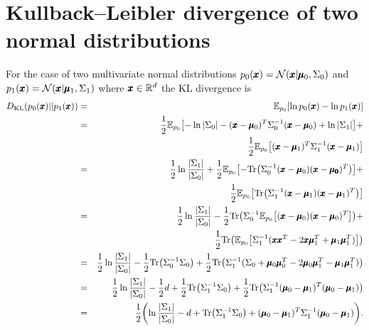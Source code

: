 \section{Kullback--Leibler divergence of two normal distributions}
For the case of two multivariate normal distributions $p_{0}(\pmb{{x}})=\mathcal{N}(\pmb{{x}}|\pmb{{\mu}}_{0},\Sigma_{0})$ and $p_{1}(\pmb{{x}})=\mathcal{N}(\pmb{{x}}|\pmb{{\mu}}_{1},\Sigma_{1})$ where $\pmb{{x}} \in \mathbb{R}^d$ the KL divergence is
\begin{eqnarray}
D_{\text{KL}}(p_{0}(\vc{x})||p_{1}(\vc{x})) & = & \mathbb{E}_{p_{0}}\left[\ln p_{0}(\vc{x})-\ln p_{1}(\vc{x})\right]\nonumber \\
 & = & \frac{1}{2}\mathbb{E}_{p_{0}}\left[-\ln|\Sigma_{0}|-(\vc{x}-\vc{\mu}_{0})^{T}\Sigma_{0}^{-1}(\vc{x}-\vc{\mu}_{0})+\ln|\Sigma_{1}|\right]+\nonumber \\
 & & \frac{1}{2}\mathbb{E}_{p_{0}}\left[ (\vc{x}-\vc{\mu}_{1})^{T}\Sigma_{1}^{-1}(\vc{x}-\vc{\mu}_{1}) \right] \nonumber\\
 & = & \frac{1}{2}\ln\frac{|\Sigma_{1}|}{|\Sigma_{0}|}+\frac{1}{2}\mathbb{E}_{p_{0}}\left[-\text{Tr}\left(\Sigma_{0}^{-1}(\vc{x}-\vc{\mu}_{0})(\vc{x}-\vc{\mu_{0}})^{T}\right)\right]+\nonumber \\
 &  & \frac{1}{2}\mathbb{E}_{p_{0}}\left[\text{Tr}\left(\Sigma_{1}^{-1}(\vc{x}-\vc{\mu}_{1})(\vc{x}-\vc{\mu}_{1})^{T}\right)\right]\nonumber \\
 & = & \frac{1}{2}\ln\frac{|\Sigma_{1}|}{|\Sigma_{0}|}-\frac{1}{2}\text{Tr}\left(\Sigma_{0}^{-1}\mathbb{E}_{p_{0}}\left[(\vc{x}-\vc{\mu}_{0})(\vc{x}-\vc{\mu}_{0})^{T}\right]\right)+\nonumber \\
 &  & \frac{1}{2}\text{Tr}\left(\mathbb{E}_{p_{0}}\left[\Sigma_{1}^{-1}(\vc{x}\vc{x}^{T}-2\vc{x}\vc{\mu}_{1}^{T}+\vc{\mu}_{1}\vc{\mu}_{1}^{T})\right]\right)\nonumber \\
 & = & \frac{1}{2}\ln\frac{|\Sigma_{1}|}{|\Sigma_{0}|}-\frac{1}{2}\text{Tr}\left(\Sigma_{0}^{-1}\Sigma_{0}\right)+\frac{1}{2}\text{Tr}\left(\Sigma_{1}^{-1}(\Sigma_{0}+\vc{\mu}_{0}\vc{\mu}_{0}^{T}-2\vc{\mu}_{0}\vc{\mu}_{1}^{T}-\vc{\mu}_{1}\vc{\mu}_{1}^{T})\right)\nonumber \\
 & = & \frac{1}{2}\ln\frac{|\Sigma_{1}|}{|\Sigma_{0}|}-\frac{1}{2}d+\frac{1}{2}\text{Tr}\left(\Sigma_{1}^{-1}\Sigma_{0}\right)+\frac{1}{2}\text{Tr}\left(\Sigma_{1}^{-1}(\vc{\mu}_{0}-\vc{\mu}_{1})^{T}(\vc{\mu}_{0}-\vc{\mu}_{1})\right)\nonumber \\
 & = & \frac{1}{2}\left(\ln\frac{|\Sigma_{1}|}{|\Sigma_{0}|}-d+\text{Tr}\left(\Sigma_{1}^{-1}\Sigma_{0}\right)+(\vc{\mu}_{0}-\vc{\mu}_{1})^{T}\Sigma_{1}^{-1}(\vc{\mu}_{0}-\vc{\mu}_{1})\right).
\end{eqnarray}
